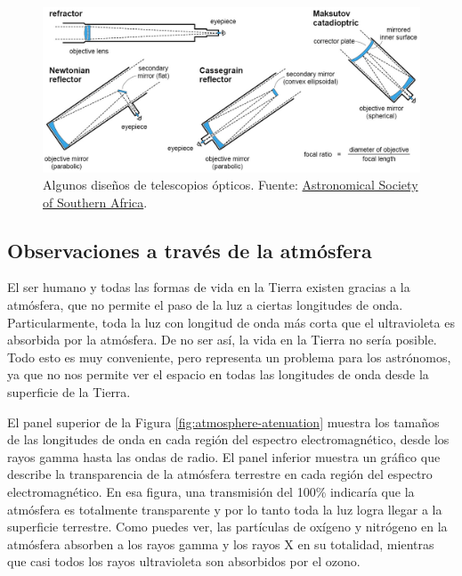 \begin{figure}[htb]
  \centering
				\includegraphics[width=\textwidth]{figures/types-of-telescopes.jpg}
				\caption{Algunos diseños de telescopios ópticos. Fuente: \href{https://assa.saao.ac.za/how-to-observe/equipment/telescopes/}{Astronomical Society of Southern Africa}.}
				\label{fig:types-of-telescopes} 
\end{figure}

\subsection{Observaciones a través de la atmósfera}
El ser humano y todas las formas de vida en la Tierra existen gracias a la atmósfera, que no permite el paso de la luz a ciertas longitudes de onda. Particularmente, toda la luz con longitud de onda más corta que el ultravioleta es absorbida por la atmósfera. De no ser así, la vida en la Tierra no sería posible. Todo esto es muy conveniente, pero representa un problema para los astrónomos, ya que no nos permite ver el espacio en todas las longitudes de onda desde la superficie de la Tierra. 

El panel superior de la Figura \ref{fig:atmosphere-atenuation} muestra los tamaños de las longitudes de onda en cada región del espectro electromagnético, desde los rayos gamma hasta las ondas de radio. El panel inferior muestra un gráfico que describe la transparencia de la atmósfera terrestre en cada región del espectro electromagnético. En esa figura, una transmisión del 100\% indicaría que la atmósfera es totalmente transparente y por lo tanto toda la luz logra llegar a la superficie terrestre. Como puedes ver, las partículas de oxígeno y nitrógeno en la atmósfera absorben a los rayos gamma y los rayos X en su totalidad, mientras que casi todos los rayos ultravioleta son absorbidos por el ozono. 

